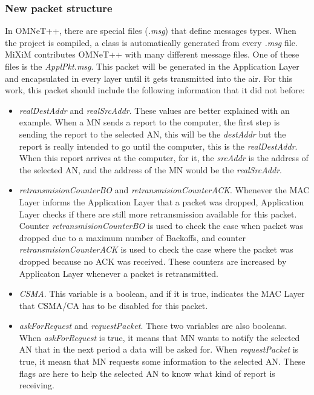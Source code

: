 \subsubsection{New packet structure}
\label{sec:packetstructure}

In \ac{OMNeT++}, there are special files (\textit{.msg}) that define messages types. When the project is compiled, a class is automatically 
generated from every \textit{.msg} file. \ac{MiXiM} contributes \ac{OMNeT++} with many different message files. One of these files is the 
\textit{ApplPkt.msg}. This packet will be generated in the Application Layer and encapsulated in every layer until it gets transmitted into the 
air. For this work, this packet should include the following information that it did not before:
\begin{itemize}
 \item \textit{realDestAddr} and \textit{realSrcAddr}. These values are better explained with an example. When a \ac{MN} sends a report to the 
computer, the first step is sending the report to the selected \ac{AN}, this will be the \textit{destAddr} but the report is really intended
to go until the computer, this is the \textit{realDestAddr}. When this report arrives at the computer, for it, the \textit{srcAddr} is the 
address of the selected \ac{AN}, and the address of the \ac{MN} would be the \textit{realSrcAddr}.
 \item \textit{retransmisionCounterBO} and \textit{retransmisionCounterACK}. Whenever the \ac{MAC} Layer informs the Application Layer that a 
packet was dropped, Application Layer checks if there are still more retransmission available for this packet. Counter
\textit{retransmisionCounterBO} is used to check the case when packet was dropped due to a maximum number of Backoffs, and counter 
\textit{retransmisionCounterACK} is used to check the case where the packet was dropped because no \ac{ACK} was received. These counters are
increased by Applicaton Layer whenever a packet is retransmitted.
 \item \textit{CSMA}. This variable is a boolean, and if it is true, indicates the \ac{MAC} Layer that \ac{CSMA/CA} has to be disabled for 
this packet.
 \item \textit{askForRequest} and \textit{requestPacket}. These two variables are also booleans. When \textit{askForRequest} is true, it means
that \ac{MN} wants to notify the selected \ac{AN} that in the next period a data will be asked for. When \textit{requestPacket} is true, it
measn that \ac{MN} requests some information to the selected \ac{AN}. These flags are here to help the selected \ac{AN} to know what kind of 
report is receiving.
\end{itemize}

